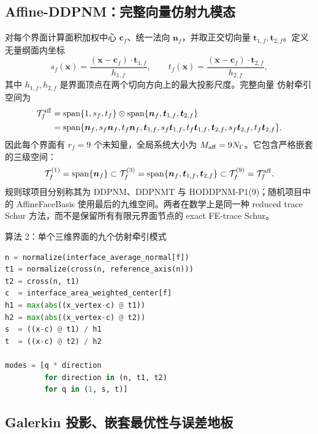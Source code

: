 \documentclass[UTF8,zihao=-4]{ctexart}
\newcommand{\T}{\mathcal{T}}
\newcommand{\Span}{\operatorname{span}}
\begin{document}
\subsection{Affine-DDPNM：完整向量仿射九模态}

对每个界面计算面积加权中心 $\bm c_f$、统一法向 $\bm n_f$，并取正交切向量
$\bm t_{1,f},\bm t_{2,f}$。定义无量纲面内坐标
\begin{equation}\label{eq:st-coordinate}
  s_f(\bm x)=\frac{(\bm x-\bm c_f)\cdot\bm t_{1,f}}{h_{1,f}},\qquad
  t_f(\bm x)=\frac{(\bm x-\bm c_f)\cdot\bm t_{2,f}}{h_{2,f}},
\end{equation}
其中 $h_{1,f},h_{2,f}$ 是界面顶点在两个切向方向上的最大投影尺度。完整向量
仿射牵引空间为
\begin{equation}\label{eq:affine-space}
\begin{aligned}
  \T_f^{\rm aff}
  &=\Span\{1,s_f,t_f\}\otimes
    \Span\{\bm n_f,\bm t_{1,f},\bm t_{2,f}\}\\
  &=\Span\{\bm n_f,s_f\bm n_f,t_f\bm n_f,
  \bm t_{1,f},s_f\bm t_{1,f},t_f\bm t_{1,f},
  \bm t_{2,f},s_f\bm t_{2,f},t_f\bm t_{2,f}\}.
\end{aligned}
\end{equation}
因此每个界面有 $r_f=9$ 个未知量，全局系统大小为
$M_{\rm aff}=9N_\Gamma$。它包含严格嵌套的三级空间：
\begin{equation}
  \T_f^{(1)}=\Span\{\bm n_f\}
  \subset
  \T_f^{(3)}=\Span\{\bm n_f,\bm t_{1,f},\bm t_{2,f}\}
  \subset
  \T_f^{(9)}=\T_f^{\rm aff}.
\end{equation}
规则球项目分别称其为 DDPNM、DDPNMT 与 HODDPNM-P1(9)；随机项目中的
AffineFaceBasis 使用最后的九维空间。两者在数学上是同一种 reduced trace
Schur 方法，而不是保留所有有限元界面节点的 exact FE-trace Schur。

\begin{algobox}{算法 2：单个三维界面的九个仿射牵引模式}
\begin{lstlisting}[style=compactcode,language=Python]
n = normalize(interface_average_normal[f])
t1 = normalize(cross(n, reference_axis(n)))
t2 = cross(n, t1)
c  = interface_area_weighted_center[f]
h1 = max(abs((x_vertex-c) @ t1))
h2 = max(abs((x_vertex-c) @ t2))
s  = ((x-c) @ t1) / h1
t  = ((x-c) @ t2) / h2

modes = [q * direction
         for direction in (n, t1, t2)
         for q in (1, s, t)]
\end{lstlisting}
\end{algobox}

\subsection{Galerkin 投影、嵌套最优性与误差地板}
\end{document}
